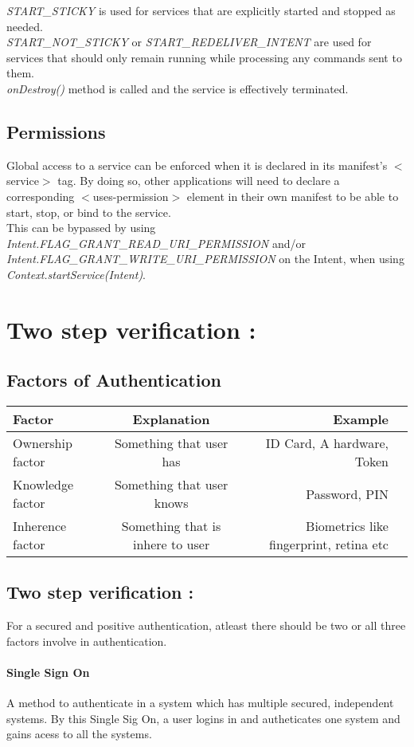 \documentclass[12pt]{article}
\begin{document}
\textit{START\_STICKY} is used for services that are explicitly started and stopped as needed. \\
\textit{START\_NOT\_STICKY} or \textit{START\_REDELIVER\_INTENT} are used for services that should only remain running while processing any commands sent to them.\\
\textit{onDestroy()} method is called and the service is effectively terminated.

\subsection{Permissions}
Global access to a service can be enforced when it is declared in its manifest's $<$service$>$ tag. 
By doing so, other applications will need to declare a corresponding $<$uses-permission$>$ element in their own manifest to be able to start, stop, or bind to the service.\\
This can be bypassed by using \textit{Intent.FLAG\_GRANT\_READ\_URI\_PERMISSION} and/or \textit{Intent.FLAG\_GRANT\_WRITE\_URI\_PERMISSION }on the Intent, when using \textit{Context.startService(Intent)}.
\pagebreak
\section{Two step verification : }
\subsection{Factors of Authentication}
\begin{tabular}{| l | c | r | p{}}
	\hline	
		Factor & Explanation & Example\\
		\hline
		\hline
		Ownership factor & Something that user has & ID Card, A hardware, Token \\ \hline
		Knowledge factor & Something that user knows & Password, PIN \\	\hline
		Inherence factor & Something that is inhere to user & Biometrics like fingerprint, retina etc\\
	\hline
\end{tabular}
\subsection{Two step verification : }
For a secured and positive authentication, atleast there should be two or all three factors involve in authentication.
\paragraph{Single Sign On} A method to authenticate in a system which has multiple secured, independent systems. By this Single Sig On, a user logins in and autheticates one system and gains acess to all the systems.
\pagebreak
\end{document}
